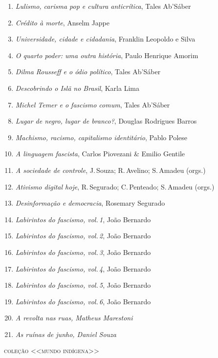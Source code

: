 \begin{enumerate}
\setlength\parskip{4.2pt}
\setlength\itemsep{-1.4mm}
\item \textit{Lulismo, carisma pop e cultura anticrítica}, Tales Ab'Sáber
\item \textit{Crédito à morte}, Anselm Jappe
\item \textit{Universidade, cidade e cidadania}, Franklin Leopoldo e Silva
\item \textit{O quarto poder: uma outra história}, Paulo Henrique Amorim
\item \textit{Dilma Rousseff e o ódio político}, Tales Ab'Sáber
\item \textit{Descobrindo o Islã no Brasil}, Karla Lima
\item \textit{Michel Temer e o fascismo comum}, Tales Ab'Sáber
\item \textit{Lugar de negro, lugar de branco?}, Douglas Rodrigues Barros
\item \textit{Machismo, racismo, capitalismo identitário}, Pablo Polese
\item \textit{A linguagem fascista}, Carlos Piovezani \& Emilio Gentile
\item \textit{A sociedade de controle}, J.\,Souza; R.\,Avelino; S.\,Amadeu (orgs.)
\item \textit{Ativismo digital hoje}, R.\,Segurado; C.\,Penteado; S.\,Amadeu (orgs.)
\item \textit{Desinformação e democracia}, Rosemary Segurado
\item \textit{Labirintos do fascismo, vol.\,1}, João Bernardo
\item \textit{Labirintos do fascismo, vol.\,2}, João Bernardo
\item \textit{Labirintos do fascismo, vol.\,3}, João Bernardo
\item \textit{Labirintos do fascismo, vol.\,4}, João Bernardo
\item \textit{Labirintos do fascismo, vol.\,5}, João Bernardo
\item \textit{Labirintos do fascismo, vol.\,6}, João Bernardo
\item \textit{A revolta nas ruas, Matheus Marestoni}
\item \textit{As ruínas de junho, Daniel Souza}
\end{enumerate}

\medskip
{\large\textsc{coleção <<mundo indígena>>}}

